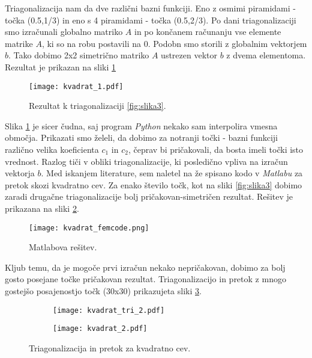 \documentclass[12pt,a4paper]{article}
\begin{document}
\noindent Triagonalizacija nam da dve različni bazni funkciji. Eno z osmimi piramidami - točka (0.5,1/3) in eno s 4 piramidami - točka (0.5,2/3). Po dani triagonalizaciji smo izračunali globalno matriko $A$ in po končanem računanju vse elemente matrike $A$, ki so na robu postavili na 0. Podobn smo storili z globalnim vektorjem $b$. Tako dobimo 2x2 simetrično matriko $A$ ustrezen vektor $b$ z dvema elementoma. Rezultat je prikazan na sliki \ref{fig:slika4}

\begin{figure}[H]
\begin{center}
\texttt{[image: kvadrat\_1.pdf]}
\caption{Rezultat k triagonalizaciji \ref{fig:slika3}.} \label{fig:slika4}
\end{center}
\end{figure} 

\noindent Slika \ref{fig:slika4} je sicer čudna, saj program \textit{Python} nekako sam interpolira vmesna območja. Prikazati smo želeli, da dobimo za notranji točki - bazni funkciji različno velika koeficienta $c_1$ in $c_2$, čeprav bi pričakovali, da bosta imeli točki isto vrednost. Razlog tiči v obliki triagonalizacije, ki posledično vpliva na izračun vektorja $b$. Med iskanjem literature, sem naletel na že spisano kodo v \textit{Matlabu} za pretok skozi kvadratno cev. Za enako število točk, kot na sliki \ref{fig:slika3} dobimo zaradi drugačne triagonalizacije bolj pričakovan-simetričen rezultat. Rešitev je prikazana na sliki \ref{fig:slika6}.

\begin{figure}[H]
\begin{center}
\texttt{[image: kvadrat\_femcode.png]}
\caption{Matlabova rešitev.} \label{fig:slika6}
\end{center}
\end{figure} 

Kljub temu, da je mogoče prvi izračun nekako nepričakovan, dobimo za bolj gosto posejane točke pričakovan rezultat. Triagonalizacijo in pretok z mnogo gostejšo posajenostjo točk (30x30) prikazujeta sliki \ref{fig:slika5}.

\begin{figure}[H]
    \centering
    \begin{subfigure}[b]{0.49\textwidth}  			
        \texttt{[image: kvadrat\_tri\_2.pdf]}
    \end{subfigure}
    \begin{subfigure}[b]{0.49\textwidth}
        \texttt{[image: kvadrat\_2.pdf]}
    \end{subfigure}
    \caption{Triagonalizacija in pretok za kvadratno cev.} \label{fig:slika5}
\end{figure}
\end{document}

